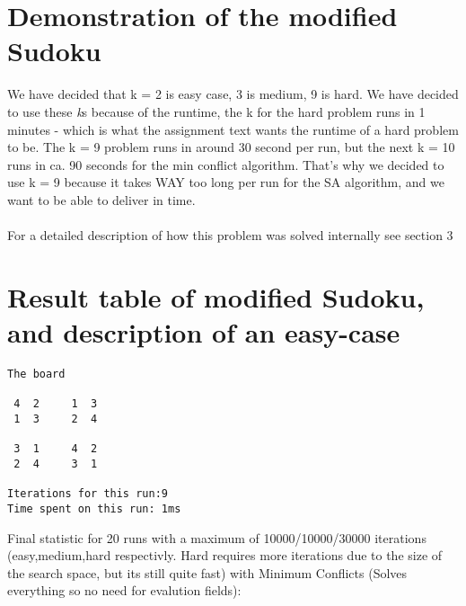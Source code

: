 \documentclass[12pt, a4paper]{article}
\begin{document}
\section{Demonstration of the modified Sudoku}
We have decided that k = 2 is easy case, 3 is medium, 9 is hard. 
We have decided to use these \textit{k}s because of the runtime, the k for the hard problem runs in 1 minutes - which is what the assignment text wants the runtime of a hard problem to be. The k = 9 problem runs in around 30 second per run, but the next k = 10 runs in ca. 90 seconds for the min conflict algorithm. That's why we decided to use k = 9 because it takes WAY too long per run for the SA algorithm, and we want to be able to deliver in time.
\\\\
For a detailed description of how this problem was solved internally see section 3

\section{Result table of modified Sudoku, and description of an easy-case}
\begin{verbatim}
The board

 4  2     1  3 
 1  3     2  4 

 3  1     4  2 
 2  4     3  1 
 
Iterations for this run:9
Time spent on this run: 1ms
\end{verbatim}

\noindent
Final statistic for 20 runs with a maximum of 10000/10000/30000 iterations (easy,medium,hard respectivly. Hard requires more iterations due to the size of the search space, but its still quite fast) with Minimum Conflicts (Solves everything so no need for evalution fields):
\end{document}
